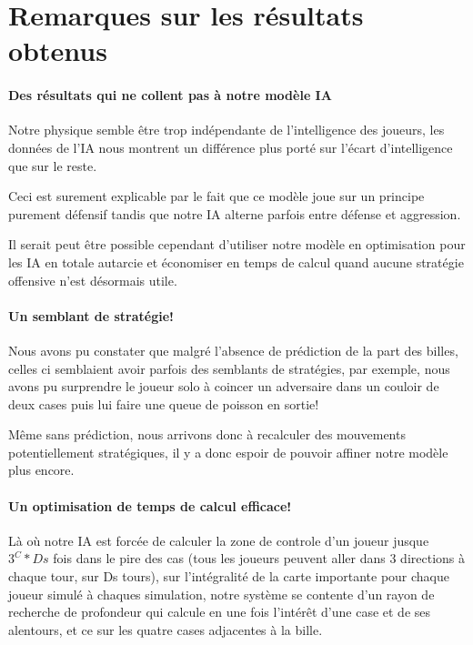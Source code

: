 	\section{Remarques sur les résultats obtenus}
	
		\paragraph{Des résultats qui ne collent pas à notre modèle IA}
		Notre physique semble être trop indépendante de l'intelligence des joueurs, les données de l'IA nous montrent un différence plus porté sur l'écart d'intelligence que sur le reste.
		
		Ceci est surement explicable par le fait que ce modèle joue sur un principe purement défensif tandis que notre IA alterne parfois entre défense et aggression.
		\begin{result}
			Il serait peut être possible cependant d'utiliser notre modèle en optimisation pour les IA en totale autarcie et économiser en temps de calcul quand aucune stratégie offensive n'est désormais utile.
		\end{result}
	
		\paragraph{Un semblant de stratégie!}
		Nous avons pu constater que malgré l'absence de prédiction de la part des billes, celles ci semblaient avoir parfois des semblants de stratégies, par exemple, nous avons pu surprendre le joueur solo à coincer un adversaire dans un couloir de deux cases puis lui faire une queue de poisson en sortie!
		
		Même sans prédiction, nous arrivons donc à recalculer des mouvements potentiellement stratégiques, il y a donc espoir de pouvoir affiner notre modèle plus encore.
		
		\paragraph{Un optimisation de temps de calcul efficace!}
		Là où notre IA est forcée de calculer la zone de controle d'un joueur jusque $3^C*Ds$ fois dans le pire des cas (tous les joueurs peuvent aller dans 3 directions à chaque tour, sur Ds tours), sur l'intégralité de la carte importante pour chaque joueur simulé à chaques simulation, notre système se contente d'un rayon de recherche de profondeur qui calcule en une fois l'intérêt d'une case et de ses alentours, et ce sur les quatre cases adjacentes à la bille.
		
